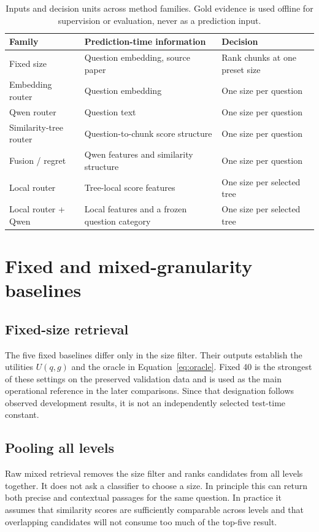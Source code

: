 \begin{table}[tbp]
\centering\small
\caption{Inputs and decision units across method families. Gold evidence
is used offline for supervision or evaluation, never as a prediction input.}
\label{tab:methodfamilies}
\begin{tabularx}{\textwidth}{@{}p{3.1cm}XX@{}}
\toprule
Family & Prediction-time information & Decision\\
\midrule
Fixed size & Question embedding, source paper & Rank chunks at one preset size\\
Embedding router & Question embedding & One size per question\\
Qwen router & Question text & One size per question\\
Similarity-tree router & Question-to-chunk score structure & One size per question\\
Fusion / regret & Qwen features and similarity structure & One size per question\\
Local router & Tree-local score features & One size per selected tree\\
Local router + Qwen & Local features and a frozen question category & One size per selected tree\\
\bottomrule
\end{tabularx}
\end{table}

\section{Fixed and mixed-granularity baselines}
\subsection{Fixed-size retrieval}
The five fixed baselines differ only in the size filter. Their outputs
establish the utilities $U(q,g)$ and the oracle in
Equation~\ref{eq:oracle}. Fixed 40 is the strongest of these settings
on the preserved validation data and is used as the main operational
reference in the later comparisons. Since that designation follows
observed development results, it is not an independently selected
test-time constant.

\subsection{Pooling all levels}
Raw mixed retrieval removes the size filter and ranks candidates from
all levels together. It does not ask a classifier to choose a size.
In principle this can return both precise and contextual passages for
the same question. In practice it assumes that similarity scores are
sufficiently comparable across levels and that overlapping candidates
will not consume too much of the top-five result.


